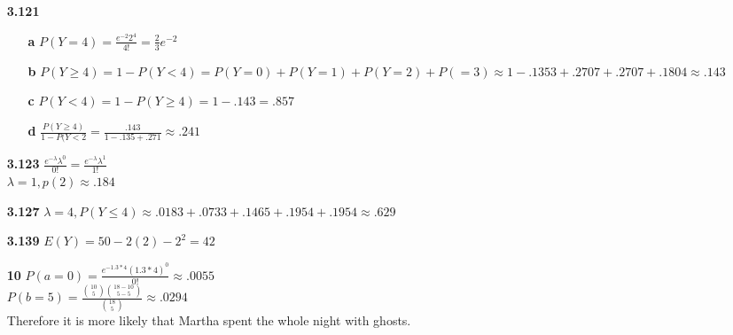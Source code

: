 \documentclass{article}
\begin{document}
\begin{itemize}
	\item[\textbf{3.121}] \begin{itemize}
			\item[\textbf{a}] $P(Y=4)=\frac{e^{-2}2^4}{4!}=\frac{2}{3}e^{-2}$
			\item[\textbf{b}] $P(Y\geq4)=1-P(Y<4)=P(Y=0)+P(Y=1)+P(Y=2)+P(=3)\approx 1-.1353+.2707+.2707+.1804\approx .143$
			\item[\textbf{c}] $P(Y<4) = 1-P(Y\geq4) = 1-.143 = .857$
			\item[\textbf{d}] $\frac{P(Y\geq4)}{1-P(Y<2}=\frac{.143}{1-.135+.271}\approx .241$
		\end{itemize}
	\item[\textbf{3.123}] $\frac{e^{-\lambda}\lambda^0}{0!}=\frac{e^{-\lambda}\lambda^1}{1!}$\\
		$\lambda=1, p(2)\approx .184$
	\item[\textbf{3.127}] $\lambda=4, P(Y\leq4)\approx .0183+.0733+.1465+.1954+.1954\approx .629$
	\item[\textbf{3.139}] $E(Y)=50-2(2)-2^2=42$\\
	\item[\textbf{10}] $P(a=0)=\frac{e^{-1.3*4}(1.3*4)^0}{0!}\approx .0055$\\
		$P(b=5)=\frac{\binom{10}{5}\binom{18-10}{5-5}}{\binom{18}{5}}\approx .0294$\\
		Therefore it is more likely that Martha spent the whole night with ghosts.
\end{itemize}
\end{document}
